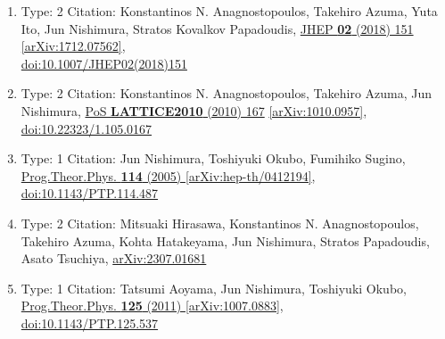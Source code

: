 \documentclass[a4paper,10pt]{article}
\begin{document}
\begin{enumerate}
\begin{enumerate}
  \item Type: 2 Citation: Konstantinos N. Anagnostopoulos, Takehiro Azuma, Yuta Ito, Jun Nishimura, Stratos Kovalkov Papadoudis, \href{https://www.doi.org/10.1007/JHEP02(2018)151}{JHEP {\bf 02} (2018) 151}  \href{https://arxiv.org/abs/1712.07562}{[arXiv:1712.07562]},\\\href{https://www.doi.org/10.1007/JHEP02(2018)151}{doi:10.1007/JHEP02(2018)151}
  \item Type: 2 Citation: Konstantinos N. Anagnostopoulos, Takehiro Azuma, Jun Nishimura, \href{https://www.doi.org/10.22323/1.105.0167}{PoS {\bf LATTICE2010} (2010) 167}  \href{https://arxiv.org/abs/1010.0957}{[arXiv:1010.0957]},\\\href{https://www.doi.org/10.22323/1.105.0167}{doi:10.22323/1.105.0167}
  \item Type: 1 Citation: Jun Nishimura, Toshiyuki Okubo, Fumihiko Sugino, \href{https://www.doi.org/10.1143/PTP.114.487}{Prog.Theor.Phys. {\bf 114} (2005) }  \href{https://arxiv.org/abs/hep-th/0412194}{[arXiv:hep-th/0412194]},\\\href{https://www.doi.org/10.1143/PTP.114.487}{doi:10.1143/PTP.114.487}
  \item Type: 2 Citation: Mitsuaki Hirasawa, Konstantinos N. Anagnostopoulos, Takehiro Azuma, Kohta Hatakeyama, Jun Nishimura, Stratos Papadoudis, Asato Tsuchiya, \href{https://arxiv.org/abs/2307.01681}{arXiv:2307.01681}
  \item Type: 1 Citation: Tatsumi Aoyama, Jun Nishimura, Toshiyuki Okubo, \href{https://www.doi.org/10.1143/PTP.125.537}{Prog.Theor.Phys. {\bf 125} (2011) }  \href{https://arxiv.org/abs/1007.0883}{[arXiv:1007.0883]},\\\href{https://www.doi.org/10.1143/PTP.125.537}{doi:10.1143/PTP.125.537}

\end{enumerate}
\end{enumerate}
\end{document}
